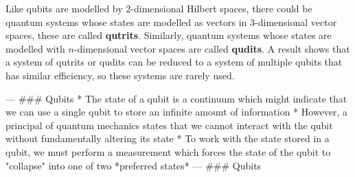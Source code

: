 Like qubits are modelled by $2$-dimensional Hilbert spaces, there could be quantum systems whose states are modelled as vectors in $3$-dimensional vector spaces, these are called \textbf{qutrits}. Similarly, quantum systems whose states are modelled with $n$-dimensional vector spaces are called \textbf{qudits}. A result shows that a system of qutrits or qudits can be reduced to a system of multiple qubits that has similar efficiency, so these systems are rarely used.

\iffalse
---
### Qubits
* The state of a qubit is a continuum which might indicate that we can use a single qubit to store an infinite amount of information
* However, a principal of quantum mechanics states that we cannot interact with the qubit without fundamentally altering its state
* To work with the state stored in a qubit, we must perform a measurement which forces the state of the qubit to "collapse" into one of two *preferred states*
---
### Qubits


